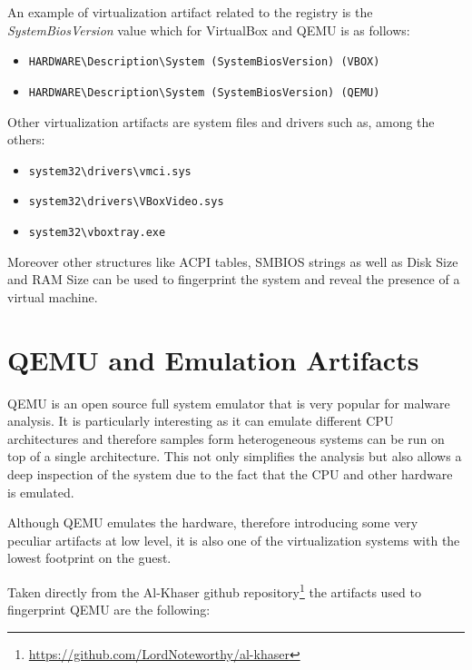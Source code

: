 An example of virtualization artifact related to the registry is the \textit{SystemBiosVersion} value which for VirtualBox and QEMU is as follows:
\begin{itemize}
    \item \lstinline{HARDWARE\Description\System (SystemBiosVersion) (VBOX)}
    \item \lstinline{HARDWARE\Description\System (SystemBiosVersion) (QEMU)} 
\end{itemize}

Other virtualization artifacts are system files and drivers such as, among the others:
\begin{itemize}
    \item \lstinline{system32\drivers\vmci.sys}
    \item \lstinline{system32\drivers\VBoxVideo.sys}
    \item \lstinline{system32\vboxtray.exe}
\end{itemize}

Moreover other structures like ACPI tables, SMBIOS strings as well as Disk Size and RAM Size can be used to fingerprint the system and reveal the presence of a virtual machine. 


\section{QEMU and Emulation Artifacts}


QEMU is an open source full system emulator that is very popular for malware analysis. It is particularly interesting as it can emulate different CPU architectures and therefore samples form heterogeneous systems can be run on top of a single architecture. This not only simplifies the analysis but also allows a deep inspection of the system due to the fact that the CPU and other hardware is emulated.

Although QEMU emulates the hardware, therefore introducing some very peculiar artifacts at low level, it is also one of the virtualization systems with the lowest footprint on the guest.


Taken directly from the Al-Khaser github repository\footnote{\url{https://github.com/LordNoteworthy/al-khaser}} the artifacts used to fingerprint QEMU are the following:

